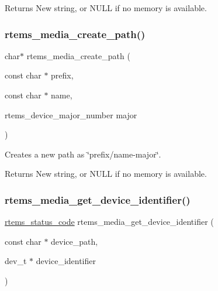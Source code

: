 \begin{DoxyReturn}{Returns}
New string, or {\ttfamily N\+U\+LL} if no memory is available. 
\end{DoxyReturn}
\mbox{\label{group__RTEMSIOMedia_ga2c85c46ea44481e17888733b40de22f5}} 
\subsubsection{\texorpdfstring{rtems\_media\_create\_path()}{rtems\_media\_create\_path()}}
{\footnotesize\ttfamily char$\ast$ rtems\+\_\+media\+\_\+create\+\_\+path (\begin{DoxyParamCaption}\item[{const char $\ast$}]{prefix,  }\item[{const char $\ast$}]{name,  }\item[{rtems\+\_\+device\+\_\+major\+\_\+number}]{major }\end{DoxyParamCaption})}



Creates a new path as \char`\"{}prefix/name-\/major\char`\"{}. 

\begin{DoxyReturn}{Returns}
New string, or {\ttfamily N\+U\+LL} if no memory is available. 
\end{DoxyReturn}
\mbox{\label{group__RTEMSIOMedia_ga5eaaa6cfb5a7e811e5deadb77ca2aaa2}} 
\subsubsection{\texorpdfstring{rtems\_media\_get\_device\_identifier()}{rtems\_media\_get\_device\_identifier()}}
{\footnotesize\ttfamily \mbox{\hyperlink{group__ClassicStatus_ga545d41846817eaba6143d52ee4d9e9fe}{rtems\+\_\+status\+\_\+code}} rtems\+\_\+media\+\_\+get\+\_\+device\+\_\+identifier (\begin{DoxyParamCaption}\item[{const char $\ast$}]{device\+\_\+path,  }\item[{dev\+\_\+t $\ast$}]{device\+\_\+identifier }\end{DoxyParamCaption})}



